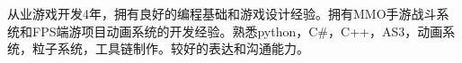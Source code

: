 


\cvself
{从业游戏开发4年，拥有良好的编程基础和游戏设计经验。拥有MMO手游战斗系统和FPS端游项目动画系统的开发经验。熟悉python，C\#，C++，AS3，动画系统，粒子系统，工具链制作。较好的表达和沟通能力。}
